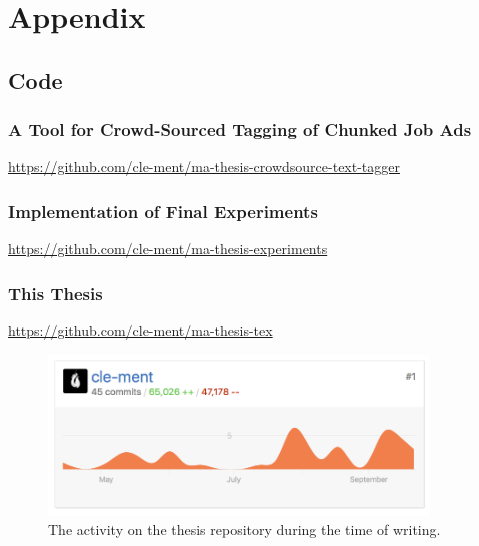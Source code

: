 
\renewcommand{\theequation}{B\arabic{equation}}
\setcounter{equation}{0}
\renewcommand{\thefigure}{B\arabic{figure}}
\setcounter{figure}{0}
\renewcommand{\thetable}{B\arabic{table}}
\setcounter{table}{0}


\clearpage

\thesisappendix

\section{Appendix}

\subsection{Code}

\subsubsection*{A Tool for Crowd-Sourced Tagging of Chunked Job Ads}
\label{sub:A Tool for Crowd-Sourced Tagging of Chunked Job Ads}

\url{https://github.com/cle-ment/ma-thesis-crowdsource-text-tagger}

\subsubsection*{Implementation of Final Experiments}
\label{sub:Implementation of Final Experiments}


\url{https://github.com/cle-ment/ma-thesis-experiments}

\subsubsection*{This Thesis}
\label{sub:This Thesis}

\url{https://github.com/cle-ment/ma-thesis-tex}

\begin{figure}[h]
  \centering
  \includegraphics[width=0.9\textwidth]{img/git-tex.png}
  \caption{The activity on the thesis repository during the time of writing.}
\label{fig:RNN}
\end{figure}



